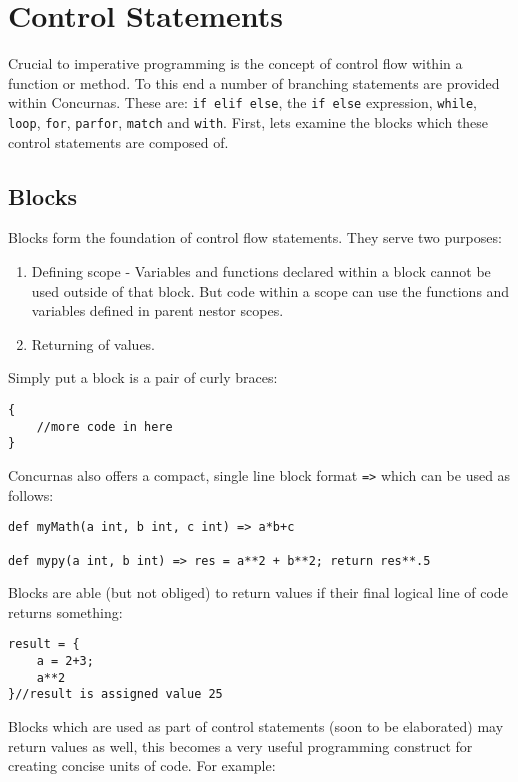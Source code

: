 \documentclass[conc-doc]{subfiles}
\begin{document}
		
	\chapter[Control Statements]{Control Statements}
Crucial to imperative programming is the concept of control flow within a function or method. To this end a number of branching statements are provided within Concurnas. These are: \lstinline{if elif else}, the \lstinline{if else} expression, \lstinline{while}, \lstinline{loop}, \lstinline{for}, \lstinline{parfor}, \lstinline{match} and \lstinline{with}. First, lets examine the blocks which these control statements are composed of.

\section{Blocks}
Blocks form the foundation of control flow statements. They serve two purposes: 

\begin{enumerate}
	\item Defining scope - Variables and functions declared within a block cannot be used outside of that block. But code within a scope can use the functions and variables defined in parent nestor scopes.
	\item Returning of values.
\end{enumerate}


Simply put a block is a pair of curly braces:
\begin{lstlisting}
{
	//more code in here	
}
\end{lstlisting}

Concurnas also offers a compact, single line block format \lstinline{=>} which can be used as follows:
\begin{lstlisting}
def myMath(a int, b int, c int) => a*b+c

def mypy(a int, b int) => res = a**2 + b**2; return res**.5
\end{lstlisting}

Blocks are able (but not obliged) to return values if their final logical line of code returns something:

\begin{lstlisting}
result = {
	a = 2+3; 
	a**2
}//result is assigned value 25
\end{lstlisting}

Blocks which are used as part of control statements (soon to be elaborated) may return values as well, this becomes a very useful programming construct for creating concise units of code. For example:
\end{document}
